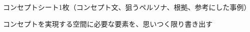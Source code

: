 
\begin{nexttime}
  \item コンセプトシート1枚（コンセプト文、狙うペルソナ、根拠、参考にした事例）
  \item コンセプトを実現する空間に必要な要素を、思いつく限り書き出す
\end{nexttime}
\aimemo
